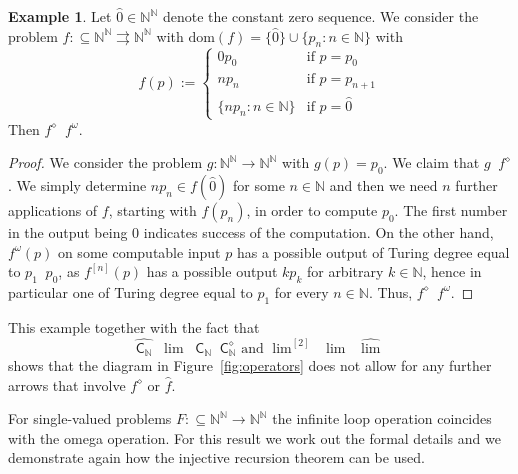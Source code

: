 \documentclass[11pt,a4paper]{amsart}
\theoremstyle{plain}
\theoremstyle{definition}
\newtheorem{exa}[thm]{Example}
\theoremstyle{defC}
\theoremstyle{thmC}
\theoremstyle{plain}
\numberwithin{equation}{section}
\def\IN{{\mathbb{N}}}
\def\In{\subseteq}
\def\mto{\rightrightarrows}
\def\C{{\mathsf{{C}}}}
\def\C{\mathsf{C}}
\def\lT{\mathop{<_{\mathrm{T}}}}
\def\leqW{\mathop{\leq_{\mathrm{W}}}}
\def\equivSW{\mathop{\equiv_{\mathrm{sW}}}}
\def\nleqW{\mathop{\not\leq_{\mathrm{W}}}}
\def\leqW{\mathop{\leq_{\mathrm{W}}}}
\def\equivSW{\mathop{\equiv_{\mathrm{sW}}}}
\def\nleqW{\mathop{\not\leq_{\mathrm{W}}}}
\def\dom{{\mathrm{dom}}}
\begin{document}
\begin{exa}
\label{example:diamond-omega}
Let $\widehat{0}\in\IN^\IN$ denote the constant zero sequence. We consider the problem $f:\In\IN^\IN\mto\IN^\IN$
with $\dom(f)=\{\widehat{0}\}\cup\{p_n:n\in\IN\}$ with
\[f(p):=\left\{\begin{array}{ll}
0p_0 & \mbox{if $p=p_0$}\\
np_n & \mbox{if $p=p_{n+1}$}\\
\{np_n:n\in\IN\} & \mbox{if $p=\widehat{0}$}
\end{array}\right.\]
Then $f^\diamond\nleqW f^\omega$.
\end{exa}
\begin{proof}
We consider the problem $g:\IN^\IN\to\IN^\IN$ with $g(p)=p_0$. We claim that $g\leqW f^\diamond$.
We simply determine $np_n\in f(\widehat{0})$ for some $n\in\IN$ and then we need $n$ further applications of $f$, starting with $f(p_n)$,
in order to compute $p_0$. The first number in the output being $0$ indicates success of the computation.
On the other hand, $f^\omega(p)$ on some computable input $p$ has
a possible output of Turing degree equal to $p_1 \lT p_0$, as $f^{[n]}(p)$ has a possible output $kp_k$ for arbitrary $k\in\IN$, hence in particular one of Turing degree equal to $p_{1}$ for every $n\in\IN$. 
Thus, $f^\diamond\nleqW f^\omega$.
\end{proof}

\noindent
This example together with the fact that 
\[\widehat{\C_\IN}\equivSW\lim\nleqW\C_\IN\equivSW\C_\IN^\diamond\mbox{ and }\lim\nolimits^{[2]}\nleqW\lim\equivSW\widehat{\lim}\]
shows that the diagram in Figure~\ref{fig:operators} does not allow for any further arrows that involve
$f^\diamond$ or $\widehat{f}$.


For single-valued problems $F:\In\IN^\IN\to\IN^\IN$ the infinite loop operation coincides with the omega operation.
For this result we work out the formal details and we demonstrate again how the injective recursion theorem can be used.
\end{document}
